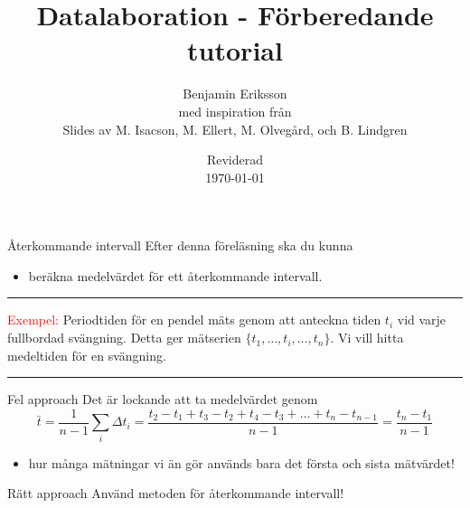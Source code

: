 \documentclass[9pt]{beamer}
\title{Datalaboration - Förberedande tutorial}
\author[benjamin.eriksson@physics.uu.se]{Benjamin Eriksson  \\ \tiny{med inspiration från} \\ \scriptsize{Slides av M. Isacson, M. Ellert, M. Olvegård, och B. Lindgren}}
\institute[Uppsala universitet]{{\small Avdelningen för tillämpad kärnfysik \\ Institutionen för fysik och astronomi} \\ \uulogo}
\date{{\small Reviderad}\\ \today}
\newcommand*\mean[1]{\bar{#1}}
\begin{document}
    \begin{frame}{Återkommande intervall}
        Efter denna föreläsning ska du kunna
        \begin{itemize}
            \item beräkna medelvärdet för ett återkommande intervall.
        \end{itemize}
    \end{frame}

    \begin{frame}
        \hrule \vspace{0.1cm}
        \textcolor{red}{Exempel:}
        Periodtiden för en pendel mäts genom att anteckna tiden $t_i$ vid varje fullbordad svängning.
        Detta ger mätserien $\{t_1, \ldots, t_i, \ldots, t_n\}$. Vi vill hitta medeltiden för en svängning.
        \vspace{0.1cm} \hrule
        
        \begin{block}{Fel approach}
            Det är lockande att ta medelvärdet genom
            \begin{equation*}
                \mean{t} = \frac{1}{n-1} \sum_i \Delta t_i = \frac{t_2 - t_1 + t_3 - t_2 + t_4 - t_3 + \ldots + t_n - t_{n-1}}{n - 1} = \frac{t_n - t_1}{n - 1}
        \end{equation*}
        \begin{itemize}
            \item hur många mätningar vi än gör används bara det första och sista mätvärdet!
        \end{itemize}
        \end{block}
       \vspace{0.2cm}
       \pause
       \begin{exampleblock}{Rätt approach}
            Använd metoden för återkommande intervall!
       \end{exampleblock}
       
    \end{frame}
\end{document}
